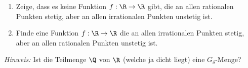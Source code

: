 \begin{exercise}

\phantom{}

\begin{enumerate}[label = (\roman*)]

  \item
  Zeige, dass es keine Funktion $f: \R \rightarrow \R$ gibt, die an allen rationalen Punkten stetig, aber an allen irrationalen Punkten unstetig ist.

  \item
  Finde eine Funktion $f: \R \rightarrow \R$ die an allen irrationalen Punkten stetig, aber an allen rationalen Punkten unstetig ist.

\end{enumerate}

\textit{Hinweis:}
Ist die Teilmenge $\Q$ von $\R$ (welche ja dicht liegt) eine $G_\delta$-Menge?

\end{exercise}

